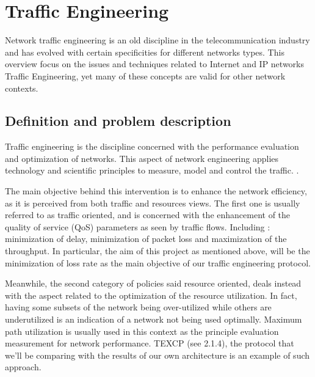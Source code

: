 
\section{Traffic Engineering}


Network traffic engineering is an old discipline in the telecommunication industry and has evolved with certain specificities for different networks types. This overview focus on the issues and techniques related to Internet and IP networks Traffic Engineering, yet many of these concepts are valid for other network contexts.

\subsection{Definition and problem description}
Traffic engineering is the discipline concerned with the performance evaluation  and optimization of  networks.  This aspect of network engineering applies technology and scientific principles to measure, model and control the traffic.  \cite {RFC3272}.  

The main objective behind this intervention is to enhance the network efficiency, as it is perceived  from both  traffic and  resources views. The first one is usually referred to as traffic oriented, and is concerned with the enhancement of the quality of service (QoS) parameters as seen by traffic flows. Including : minimization of delay, minimization of packet loss and maximization of the throughput. In particular, the aim of this project as mentioned above, will be the minimization of loss rate as the main objective of our traffic engineering protocol.

Meanwhile, the second category of policies said resource oriented,  deals instead with the aspect related to the optimization of the resource utilization. In fact, having some subsets of the network being over-utilized while others are underutilized is an indication of a network not being used optimally. Maximum path utilization is usually used in this context as the principle evaluation measurement for network performance. TEXCP (see 2.1.4), the protocol that we'll be comparing with the results of our own architecture is an example of such approach. 

